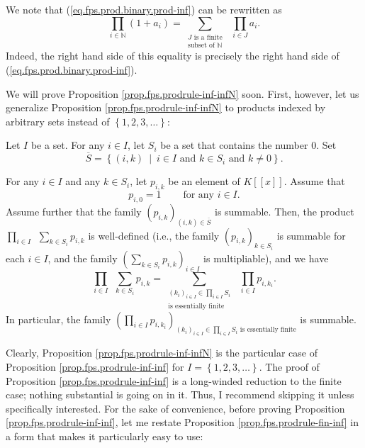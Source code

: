 We note that (\ref{eq.fps.prod.binary.prod-inf}) can be rewritten as%
\begin{equation}
\prod_{i\in\mathbb{N}}\left(  1+a_{i}\right)  =\sum_{\substack{J\text{ is a
finite}\\\text{subset of }\mathbb{N}}}\ \ \prod_{i\in J}a_{i}.
\label{eq.fps.prod.binary.prod-inf2}%
\end{equation}
Indeed, the right hand side of this equality is precisely the right hand side
of (\ref{eq.fps.prod.binary.prod-inf}).

We will prove Proposition \ref{prop.fps.prodrule-inf-infN} soon. First,
however, let us generalize Proposition \ref{prop.fps.prodrule-inf-infN} to
products indexed by arbitrary sets instead of $\left\{  1,2,3,\ldots\right\}
$:

\begin{proposition}
\label{prop.fps.prodrule-inf-inf}Let $I$ be a set. For any $i\in I$, let
$S_{i}$ be a set that contains the number $0$. Set%
\[
\overline{S}=\left\{  \left(  i,k\right)  \ \mid\ i\in I\text{ and }k\in
S_{i}\text{ and }k\neq0\right\}  .
\]


For any $i\in I$ and any $k\in S_{i}$, let $p_{i,k}$ be an element of
$K\left[  \left[  x\right]  \right]  $. Assume that
\begin{equation}
p_{i,0}=1\ \ \ \ \ \ \ \ \ \ \text{for any }i\in I.
\label{eq.prop.fps.prodrule-inf-inf.pi0=1}%
\end{equation}
Assume further that the family $\left(  p_{i,k}\right)  _{\left(  i,k\right)
\in\overline{S}}$ is summable. Then, the product $\prod_{i\in I}\ \ \sum_{k\in
S_{i}}p_{i,k}$ is well-defined (i.e., the family $\left(  p_{i,k}\right)
_{k\in S_{i}}$ is summable for each $i\in I$, and the family $\left(
\sum_{k\in S_{i}}p_{i,k}\right)  _{i\in I}$ is multipliable), and we have%
\begin{equation}
\prod_{i\in I}\ \ \sum_{k\in S_{i}}p_{i,k}=\sum_{\substack{\left(
k_{i}\right)  _{i\in I}\in\prod_{i\in I}S_{i}\\\text{is essentially finite}%
}}\ \ \prod_{i\in I}p_{i,k_{i}}. \label{eq.prop.fps.prodrule-inf-inf.eq}%
\end{equation}
In particular, the family $\left(  \prod_{i\in I}p_{i,k_{i}}\right)  _{\left(
k_{i}\right)  _{i\in I}\in\prod_{i\in I}S_{i}\text{ is essentially finite}}$
is summable.
\end{proposition}

Clearly, Proposition \ref{prop.fps.prodrule-inf-infN} is the particular case
of Proposition \ref{prop.fps.prodrule-inf-inf} for $I=\left\{  1,2,3,\ldots
\right\}  $. The proof of Proposition \ref{prop.fps.prodrule-inf-inf} is a
long-winded reduction to the finite case; nothing substantial is going on in
it. Thus, I recommend skipping it unless specifically interested. For the sake
of convenience, before proving Proposition \ref{prop.fps.prodrule-inf-inf},
let me restate Proposition \ref{prop.fps.prodrule-fin-inf} in a form that
makes it particularly easy to use:


